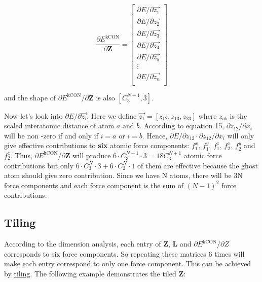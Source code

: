 \documentclass{article}
\begin{document}
\begin{equation}
\frac{\partial{E^{\mathrm{kCON}}}}{\partial{\mathbf{Z}}} = 
\left[
	\begin{array}{c}
		\partial{E} / \partial{\vec{z_{1}}}  \\
		\partial{E} / \partial{\vec{z_{2}}}  \\
		\partial{E} / \partial{\vec{z_{3}}}  \\
		\partial{E} / \partial{\vec{z_{4}}}  \\
		\partial{E} / \partial{\vec{z_{5}}}  \\
		\vdots \\
		\partial{E} / \partial{\vec{z_{n}}}  \\
	\end{array}
\right]
\end{equation}

\noindent and the shape of $\partial{E^{\mathrm{kCON}}} / \partial{\boldsymbol{Z}}$ is
also $[C^{N+1}_{3}, 3]$. 

Now let's look into $\partial{E} / \partial{\vec{z_{i}}}$. Here we define 
$\vec{z_{1}} = [z_{12}, z_{13}, z_{23}]$ where $z_{ab}$ is the scaled interatomic distance of
atom $a$ and $b$. According to equation 15, $\partial{z_{12}} / \partial{x_{i}}$ will be non
-zero if and only if $i = a$ or $i = b$. Hence, 
$\partial{E} / \partial{z_{12}} \cdot \partial{z_{12}} / \partial{x_{i}}$ will only give 
effective contributions to \textbf{six} atomic force components: $f^x_1$, $f^y_1$, $f^z_1$, 
$f^x_2$, $f^y_2$ and $f^z_2$. Thus, $\partial{E^{\mathrm{kCON}}} / \partial{\boldsymbol{Z}}$ 
will produce $6 \cdot C^{N+1}_3 \cdot 3=18C^{N+1}_3$ atomic force contributions but only
$6 \cdot C^N_3 \cdot 3 + 6 \cdot C^N_2 \cdot 1$ of them are effective because the ghost atom 
should give zero contribution. Since we have N atoms, there will be 3N force components and 
each force component is the sum of $(N - 1)^2$ force contributions.

\subsection{Tiling}

According to the dimension analysis, each entry of \textbf{Z}, \textbf{L} and 
$\partial{E^{\mathrm{kCON}}} / \partial{Z}$ corresponds to six force components. So repeating 
these matrices 6 times will make each entry correspond to only one force component. This can
be achieved by  
\href{https://docs.scipy.org/doc/numpy/reference/generated/numpy.tile.html}{tiling}.
The following example demonstrates the tiled \textbf{Z}:
\end{document}
